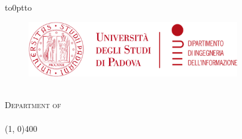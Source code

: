 \begin{titlingpage}
	\begin{center}
		\vbox to0pt{\vbox to\vss}
		\begin{figure}
			\centering
			\includegraphics[height=2.45cm]{themes/unipd-dei/static/unipd-dei.png}%
		\end{figure}

		{\scshape \Large{\bfseries{\UnivName}}} \\
		{\scshape \large{Department of \DeptName}} \\
		\vspace{3pt}
		{\scshape \large{\textit{\DegreeName}}} \\
		\line(1, 0){400} \\


		\vspace{1cm}
		{\huge{\bfseries{\textcolor{SchoolColor}{\Title}}} \par}\vspace{0.7cm} %
		\vspace{1cm}


\end{center}
\end{titlingpage}
